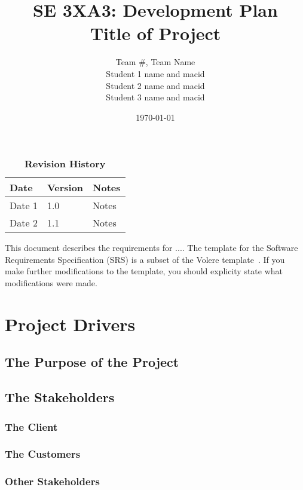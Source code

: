 \documentclass[12pt, titlepage]{article}
\title{SE 3XA3: Development Plan\\Title of Project}
\author{Team \#, Team Name
		\\ Student 1 name and macid
		\\ Student 2 name and macid
		\\ Student 3 name and macid
}
\date{\today}
\begin{document}
\maketitle

\tableofcontents
\listoftables
\listoffigures

\begin{table}[bp]
\caption{\bf Revision History}
\begin{tabularx}{\textwidth}{p{3cm}p{2cm}X}
\toprule {\bf Date} & {\bf Version} & {\bf Notes}\\
\midrule
Date 1 & 1.0 & Notes\\
Date 2 & 1.1 & Notes\\
\bottomrule
\end{tabularx}
\end{table}

\newpage


This document describes the requirements for ....  The template for the Software
Requirements Specification (SRS) is a subset of the Volere
template~\citep{RobertsonAndRobertson2012}.  If you make further modifications
to the template, you should explicity state what modifications were made.

\section{Project Drivers}

\subsection{The Purpose of the Project}

\subsection{The Stakeholders}

\subsubsection{The Client}

\subsubsection{The Customers}

\subsubsection{Other Stakeholders}
\end{document}
